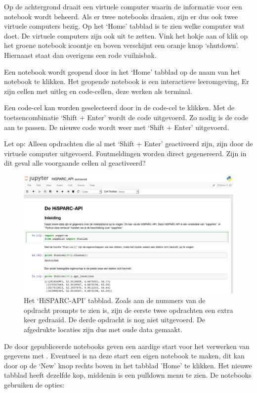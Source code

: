 Op de achtergrond draait een virtuele computer waarin de informatie voor
een notebook wordt beheerd. Als er twee notebooks draaien, zijn er dus ook twee virtuele computers bezig. Op het
`Home' tabblad is te zien welke computer wat doet. De virtuele computers zijn ook uit te zetten. Vink het hokje aan of
klik op het groene notebook icoontje en boven verschijnt een oranje knop `shutdown'. Hiernaast staat dan overigens
een rode vuilnisbak.

Een notebook wordt geopend door in het `Home' tabblad op de naam van het notebook te klikken. Het geopende notebook
is een interactieve leeromgeving, Er zijn cellen met uitleg en code-cellen, deze werken als terminal.

Een code-cel kan worden geselecteerd door in de code-cel te klikken. Met de toetsencombinatie `Shift + Enter' wordt de code uitgevoerd. Zo nodig
is de code aan te passen. De nieuwe code wordt weer met `Shift + Enter' uitgevoerd.

Let op: Alleen opdrachten die al met `Shift + Enter' geactiveerd zijn, zijn door de virtuele computer uitgevoerd. Foutmeldingen
worden direct gegenereerd. Zijn in dit geval alle voorgaande cellen al geactiveerd?

\begin{figure}[H]
\includegraphics[width=16cm]{HiSPARC_API.png}
\caption{Het `HiSPARC-API' tabblad. Zoals aan de nummers van de opdracht prompts te zien is, zijn de eerste twee opdrachten
een extra keer gedraaid. De derde opdracht is nog niet uitgevoerd. De afgedrukte locaties zijn dus met oude data gemaakt.}
\end{figure}

De door \hisparc gepubliceerde notebooks geven een aardige start voor het verwerken van gegevens met \python.
Eventueel is na deze start een eigen notebook te maken, dit kan door op de `New' knop rechts boven in het tabblad 'Home' te
klikken. Het nieuwe tabblad heeft dezelfde kop, middenin is een pulldown menu te zien. De notebooks gebruiken de opties:

